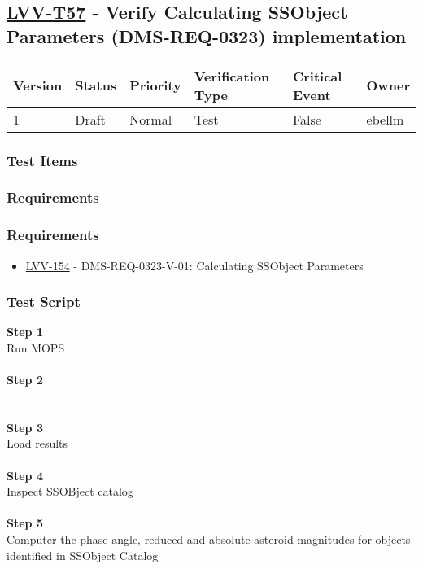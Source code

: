 \hypertarget{lvv-t57---verify-calculating-ssobject-parameters-dms-req-0323-implementation}{%
\subsection{\texorpdfstring{\href{https://jira.lsstcorp.org/secure/Tests.jspa\#/testCase/LVV-T57}{LVV-T57}
- Verify Calculating SSObject Parameters (DMS-REQ-0323)
implementation}{LVV-T57 - Verify Calculating SSObject Parameters (DMS-REQ-0323) implementation}}\label{lvv-t57---verify-calculating-ssobject-parameters-dms-req-0323-implementation}}

\begin{longtable}[]{@{}llllll@{}}
\toprule
Version & Status & Priority & Verification Type & Critical Event &
Owner\tabularnewline
\midrule
\endhead
1 & Draft & Normal & Test & False & ebellm\tabularnewline
\bottomrule
\end{longtable}

\hypertarget{test-items-4}{%
\subsubsection{Test Items}\label{test-items-4}}

\hypertarget{requirements-8}{%
\subsubsection{Requirements}\label{requirements-8}}

\hypertarget{requirements-9}{%
\subsubsection{Requirements}\label{requirements-9}}

\begin{itemize}
\tightlist
\item
  \href{https://jira.lsstcorp.org/browse/LVV-154}{LVV-154} -
  DMS-REQ-0323-V-01: Calculating SSObject Parameters
\end{itemize}

\hypertarget{test-script-4}{%
\subsubsection{Test Script}\label{test-script-4}}

\textbf{Step 1}\\
Run MOPS\\
~\\
\textbf{Step 2}\\
~\\
~\\
\textbf{Step 3}\\
Load results\\
~\\
\textbf{Step 4}\\
Inspect SSOBject catalog\\
~\\
\textbf{Step 5}\\
Computer the phase angle, reduced and absolute asteroid magnitudes for
objects identified in SSObject Catalog\\
~\\

